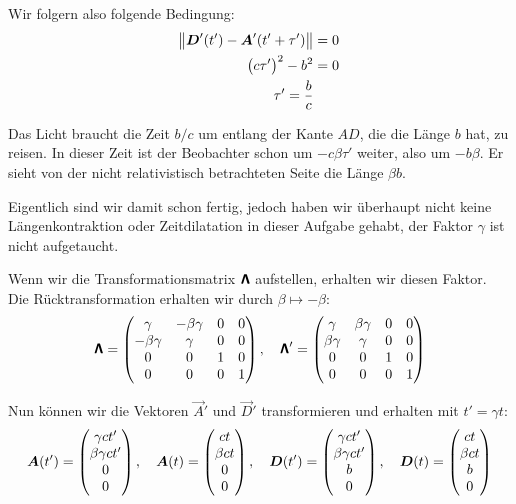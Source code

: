 Wir folgern also folgende Bedingung:
\begin{align*}
	\norm{\vec D'(t') - \vec A'(t' + \tau')} &= 0 \\
	\del{c \tau'}^2 - b^2 &= 0 \\
	\tau' = \frac bc
\end{align*}

Das Licht braucht die Zeit $b/c$ um entlang der Kante $AD$, die die Länge $b$
hat, zu reisen. In dieser Zeit ist der Beobachter schon um $- c \beta \tau'$
weiter, also um $- b \beta$. Er sieht von der nicht relativistisch betrachteten
Seite die Länge $\beta b$.

Eigentlich sind wir damit schon fertig, jedoch haben wir überhaupt nicht keine
Längenkontraktion oder Zeitdilatation in dieser Aufgabe gehabt, der Faktor
$\gamma$ ist nicht aufgetaucht.

Wenn wir die Transformationsmatrix $\boldsymbol{\mathsf{\Lambda}}$ aufstellen, erhalten wir
diesen Faktor. Die Rücktransformation erhalten wir durch $\beta \mapsto -
\beta$:
\[
	\boldsymbol{\mathsf{\Lambda}}
	=
	\begin{pmatrix}
		\gamma & - \beta \gamma & 0 & 0 \\
		- \beta \gamma & \gamma & 0 & 0 \\
		0 & 0 & 1 & 0 \\
		0 & 0 & 0 & 1
	\end{pmatrix}
	,\quad
	\boldsymbol{\mathsf{\Lambda}}'
	=
	\begin{pmatrix}
		\gamma & \beta \gamma & 0 & 0 \\
		\beta \gamma & \gamma & 0 & 0 \\
		0 & 0 & 1 & 0 \\
		0 & 0 & 0 & 1
	\end{pmatrix}
\]

Nun können wir die Vektoren $\vec A'$ und $\vec D'$ transformieren und erhalten
mit $t' = \gamma t$:
\[
	\boldsymbol{A}(t')
	=
	\begin{pmatrix}
		\gamma ct' \\ \beta \gamma ct' \\ 0 \\ 0
	\end{pmatrix}
	,\quad
	\boldsymbol{A}(t)
	=
	\begin{pmatrix}
		ct \\ \beta ct \\ 0 \\ 0
	\end{pmatrix}
	,\quad
	\boldsymbol{D}(t')
	=
	\begin{pmatrix}
		\gamma ct' \\ \beta \gamma ct' \\ b \\ 0
	\end{pmatrix}
	,\quad
	\boldsymbol{D}(t)
	=
	\begin{pmatrix}
		ct \\ \beta ct \\ b \\ 0
	\end{pmatrix}
\]

